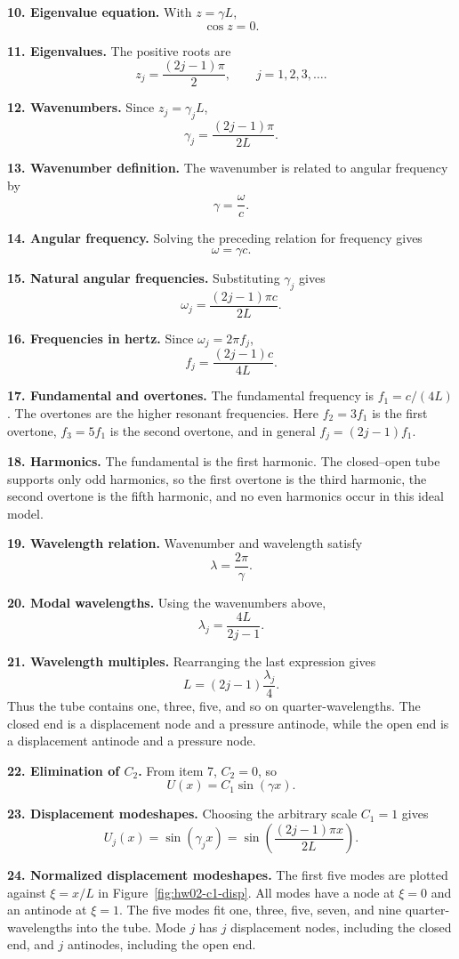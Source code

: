 \textbf{10. Eigenvalue equation.} With $z=\gamma L$,
\[
\boxed{\cos z=0}.
\]

\textbf{11. Eigenvalues.} The positive roots are
\[
\boxed{z_j=\frac{(2j-1)\pi}{2}},\qquad j=1,2,3,\ldots.
\]

\textbf{12. Wavenumbers.} Since $z_j=\gamma_jL$,
\[
\boxed{\gamma_j=\frac{(2j-1)\pi}{2L}}.
\]

\textbf{13. Wavenumber definition.} The wavenumber is related to angular frequency by
\[
\boxed{\gamma=\frac{\omega}{c}}.
\]

\textbf{14. Angular frequency.} Solving the preceding relation for frequency gives
\[
\boxed{\omega=\gamma c}.
\]

\textbf{15. Natural angular frequencies.} Substituting $\gamma_j$ gives
\[
\boxed{\omega_j=\frac{(2j-1)\pi c}{2L}}.
\]

\textbf{16. Frequencies in hertz.} Since $\omega_j=2\pi f_j$,
\[
\boxed{f_j=\frac{(2j-1)c}{4L}}.
\]

\textbf{17. Fundamental and overtones.} The fundamental frequency is $f_1=c/(4L)$. The overtones are the higher resonant frequencies. Here $f_2=3f_1$ is the first overtone, $f_3=5f_1$ is the second overtone, and in general $f_j=(2j-1)f_1$.

\textbf{18. Harmonics.} The fundamental is the first harmonic. The closed--open tube supports only odd harmonics, so the first overtone is the third harmonic, the second overtone is the fifth harmonic, and no even harmonics occur in this ideal model.

\textbf{19. Wavelength relation.} Wavenumber and wavelength satisfy
\[
\boxed{\lambda=\frac{2\pi}{\gamma}}.
\]

\textbf{20. Modal wavelengths.} Using the wavenumbers above,
\[
\boxed{\lambda_j=\frac{4L}{2j-1}}.
\]

\textbf{21. Wavelength multiples.} Rearranging the last expression gives
\[
\boxed{L=(2j-1)\frac{\lambda_j}{4}}.
\]
Thus the tube contains one, three, five, and so on quarter-wavelengths. The closed end is a displacement node and a pressure antinode, while the open end is a displacement antinode and a pressure node.

\textbf{22. Elimination of $C_2$.} From item 7, $C_2=0$, so
\[
\boxed{U(x)=C_1\sin(\gamma x)}.
\]

\textbf{23. Displacement modeshapes.} Choosing the arbitrary scale $C_1=1$ gives
\[
\boxed{U_j(x)=\sin(\gamma_jx)=\sin\left(\frac{(2j-1)\pi x}{2L}\right)}.
\]

\textbf{24. Normalized displacement modeshapes.} The first five modes are plotted against $\xi=x/L$ in Figure~\ref{fig:hw02-c1-disp}. All modes have a node at $\xi=0$ and an antinode at $\xi=1$. The five modes fit one, three, five, seven, and nine quarter-wavelengths into the tube. Mode $j$ has $j$ displacement nodes, including the closed end, and $j$ antinodes, including the open end.

